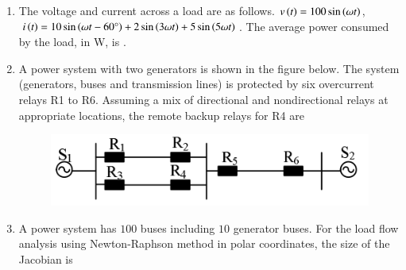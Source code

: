 \documentclass[journal,12pt,onecolumn]{IEEEtran}
\theoremstyle{remark}
\begin{document}
\begin{enumerate}[start=1, label=Q.\arabic*]
    \hfill{}

    \item The voltage  and current  across a load are as follows.
    $v\left(t\right) = 100\sin\left(\omega t\right)$, $i\left(t\right) = 10\sin\left(\omega t - 60\degree\right) + 2\sin\left(3\omega t\right) + 5\sin\left(5\omega t\right)$.
    The average power consumed by the load, in W, is \underline{\hspace{2cm}}.

    \hfill{}

    \item A power system with two generators is shown in the figure below. The system (generators, buses and transmission lines) is protected by six overcurrent relays R1 to R6. Assuming a mix of directional and nondirectional relays at appropriate locations, the remote backup relays for R4 are
    \begin{figure}[H]
        \includegraphics[width=0.4\columnwidth]{Figures/2q13.png}
        \centering
        \caption{}
    \end{figure}
    \begin{enumerate}
    \end{enumerate}

    \hfill{}

    \item A power system has $100$ buses including $10$ generator buses. For the load flow analysis using Newton-Raphson method in polar coordinates, the size of the Jacobian is
    \begin{enumerate}
    \end{enumerate}


\end{enumerate}
\end{document}
